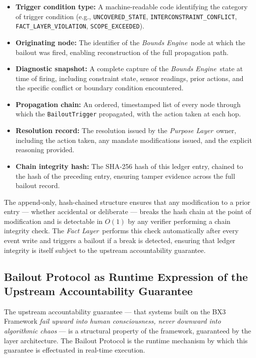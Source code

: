 \documentclass[12pt]{article}
\newcommand{\purpose}{\textit{Purpose Layer}}
\newcommand{\bounds}{\textit{Bounds Engine}}
\newcommand{\fact}{\textit{Fact Layer}}
\begin{document}
\begin{itemize}
\item \textbf{Trigger condition type:} A machine-readable code identifying the category of trigger condition (e.g., \texttt{UNCOVERED\_STATE}, \texttt{INTERCONSTRAINT\_CONFLICT}, \texttt{FACT\_LAYER\_VIOLATION}, \texttt{SCOPE\_EXCEEDED}).
\item \textbf{Originating node:} The identifier of the \bounds\ node at which the bailout was fired, enabling reconstruction of the full propagation path.
\item \textbf{Diagnostic snapshot:} A complete capture of the \bounds\ state at time of firing, including constraint state, sensor readings, prior actions, and the specific conflict or boundary condition encountered.
\item \textbf{Propagation chain:} An ordered, timestamped list of every node through which the \texttt{BailoutTrigger} propagated, with the action taken at each hop.
\item \textbf{Resolution record:} The resolution issued by the \purpose\ owner, including the action taken, any mandate modifications issued, and the explicit reasoning provided.
\item \textbf{Chain integrity hash:} The SHA-256 hash of this ledger entry, chained to the hash of the preceding entry, ensuring tamper evidence across the full bailout record.
\end{itemize}

The append-only, hash-chained structure ensures that any modification to a prior entry --- whether accidental or deliberate --- breaks the hash chain at the point of modification and is detectable in $O(1)$ by any verifier performing a chain integrity check. The \fact\ performs this check automatically after every event write and triggers a bailout if a break is detected, ensuring that ledger integrity is itself subject to the upstream accountability guarantee.

\subsection{Bailout Protocol as Runtime Expression of the Upstream Accountability Guarantee}
\label{sec:runtime-expression}

The upstream accountability guarantee --- that systems built on the BX3 Framework \textit{fail upward into human consciousness, never downward into algorithmic chaos} --- is a structural property of the framework, guaranteed by the layer architecture. The Bailout Protocol is the runtime mechanism by which this guarantee is effectuated in real-time execution.
\end{document}

